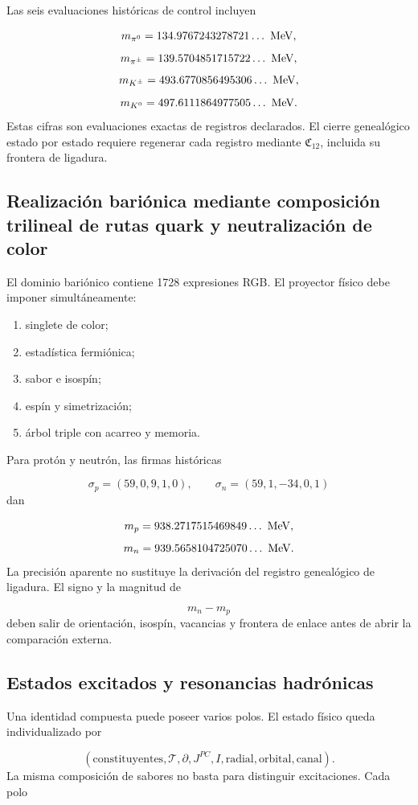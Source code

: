 Las seis evaluaciones históricas de control incluyen

\[
 m_{\pi^0}=134.9767243278721\ldots\ {\rm MeV},
\]
\[
 m_{\pi^\pm}=139.5704851715722\ldots\ {\rm MeV},
\]
\[
 m_{K^\pm}=493.6770856495306\ldots\ {\rm MeV},
\]
\[
 m_{K^0}=497.6111864977505\ldots\ {\rm MeV}.
\]
Estas cifras son evaluaciones exactas de registros declarados. El cierre genealógico estado por estado requiere regenerar cada registro mediante \(\mathfrak C_{12}\), incluida su frontera de ligadura.

\subsection{Realización bariónica mediante composición trilineal de rutas quark y neutralización de color}
El dominio bariónico contiene 1728 expresiones RGB. El proyector físico debe imponer simultáneamente:

\begin{enumerate}
\item singlete de color;
\item estadística fermiónica;
\item sabor e isospín;
\item espín y simetrización;
\item árbol triple con acarreo y memoria.
\end{enumerate}
Para protón y neutrón, las firmas históricas

\[
 \sigma_p=(59,0,9,1,0),\qquad
 \sigma_n=(59,1,-34,0,1)
\]
dan

\[
 m_p=938.2717515469849\ldots\ {\rm MeV},
\]
\[
 m_n=939.5658104725070\ldots\ {\rm MeV}.
\]
La precisión aparente no sustituye la derivación del registro genealógico de ligadura. El signo y la magnitud de

\[
 m_n-m_p
\]
deben salir de orientación, isospín, vacancias y frontera de enlace antes de abrir la comparación externa.

\subsection{Estados excitados y resonancias hadrónicas}
Una identidad compuesta puede poseer varios polos. El estado físico queda individualizado por

\[
 (\text{constituyentes},\mathcal T,\partial,
 J^{PC},I,\text{radial},\text{orbital},\text{canal}).
\]
La misma composición de sabores no basta para distinguir excitaciones. Cada polo

